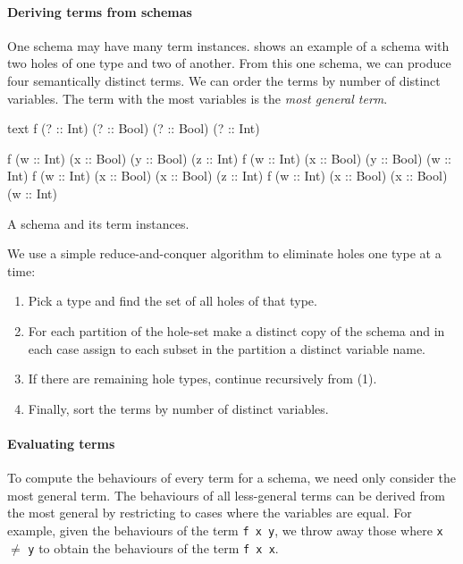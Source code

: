 \paragraph{Deriving terms from schemas}
One schema may have many term instances.   shows
an example of a schema with two holes of one type and two of another.
From this one schema, we can produce four semantically distinct terms.
We can order the terms by number of distinct variables.  The term with
the most variables is the \emph{most general term}.

\begin{listing}
\centering
\begin{cminted}{text}
f (? :: Int) (? :: Bool) (? :: Bool) (? :: Int)

f (w :: Int) (x :: Bool) (y :: Bool) (z :: Int)
f (w :: Int) (x :: Bool) (y :: Bool) (w :: Int)
f (w :: Int) (x :: Bool) (x :: Bool) (z :: Int)
f (w :: Int) (x :: Bool) (x :: Bool) (w :: Int)
\end{cminted}
\caption{A schema and its term instances.}\label{lst:schematerms}
\end{listing}

We use a simple reduce-and-conquer algorithm to eliminate holes one
type at a time:

\begin{enumerate}
\item Pick a type and find the set of all holes of that type.
\item For each partition of the hole-set make a distinct copy of the
  schema and in each case assign to each subset in the partition a
  distinct variable name.
\item If there are remaining hole types, continue recursively from
  (1).
\item Finally, sort the terms by number of distinct variables.
\end{enumerate}

\paragraph{Evaluating terms}
To compute the behaviours of every term for a schema, we need only
consider the most general term.  The behaviours of all less-general
terms can be derived from the most general by restricting to cases
where the variables are equal.  For example, given the behaviours of
the term \verb|f x y|, we throw away those where \verb|x| $\neq$
\verb|y| to obtain the behaviours of the term \verb|f x x|.

